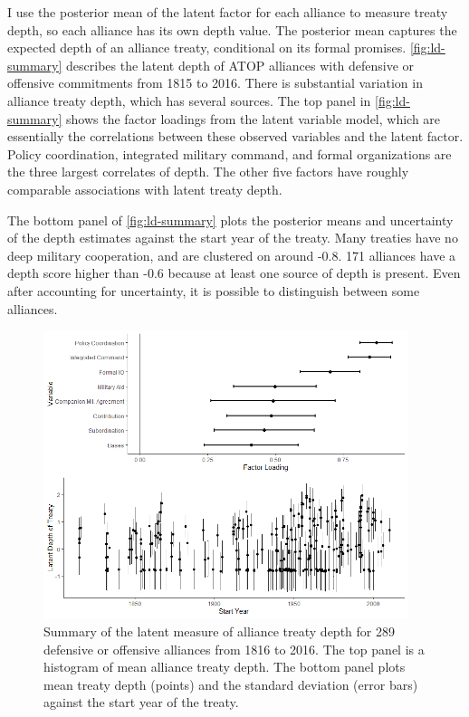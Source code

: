 \documentclass[12pt]{article}
\begin{document}
I use the posterior mean of the latent factor for each alliance to measure treaty depth, so each alliance has its own depth value.
The posterior mean captures the expected depth of an alliance treaty, conditional on its formal promises. 
\autoref{fig:ld-summary} describes the latent depth of ATOP alliances with defensive or offensive commitments from 1815 to 2016.
There is substantial variation in alliance treaty depth, which has several sources. 
The top panel in \autoref{fig:ld-summary} shows the factor loadings from the latent variable model, which are essentially the correlations between these observed variables and the latent factor. 
Policy coordination, integrated military command, and formal organizations are the three largest correlates of depth. 
The other five factors have roughly comparable associations with latent treaty depth. 


The bottom panel of \autoref{fig:ld-summary} plots the posterior means and uncertainty of the depth estimates against the start year of the treaty. 
Many treaties have no deep military cooperation, and are clustered on around -0.8.  
171 alliances have a depth score higher than -0.6 because at least one source of depth is present. 
Even after accounting for uncertainty, it is possible to distinguish between some alliances. 


\begin{figure}
	\centering
		\includegraphics[width=0.95\textwidth]{../figures/ld-summary.png}
	\caption{Summary of the latent measure of alliance treaty depth for 289 defensive or offensive alliances from 1816 to 2016. The top panel is a histogram of mean alliance treaty depth. The bottom panel plots mean treaty depth (points) and the standard deviation (error bars) against the start year of the treaty.}
	\label{fig:ld-summary}
\end{figure}
\end{document}
